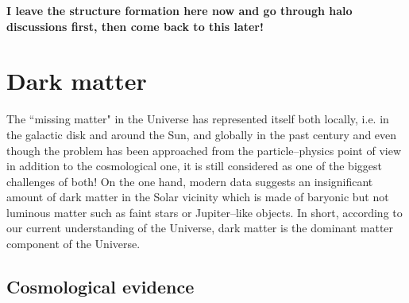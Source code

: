 \documentclass[paper=a4, fontsize=11pt]{scrartcl} %
\numberwithin{equation}{section} %
\numberwithin{figure}{section} %
\numberwithin{table}{section} %
\begin{document}
{\bf I leave the structure formation here now and go through halo discussions first, then come back to this later!}

\label{sec:structure formation}

\newpage
\section{Dark matter}
The ``missing matter" in the Universe has represented itself both locally, i.e. in the galactic disk and around the Sun, and globally in the past century and even though the problem has been approached from the particle--physics point of view in addition to the cosmological one, it is still considered as one of the biggest challenges of both! On the one hand, modern data suggests an insignificant amount of dark matter in the Solar vicinity which is made of baryonic but not luminous matter such as faint stars or Jupiter--like objects. In short, according to our current understanding of the Universe, dark matter is the dominant matter component of the Universe.

\subsection{Cosmological evidence}
\end{document}
